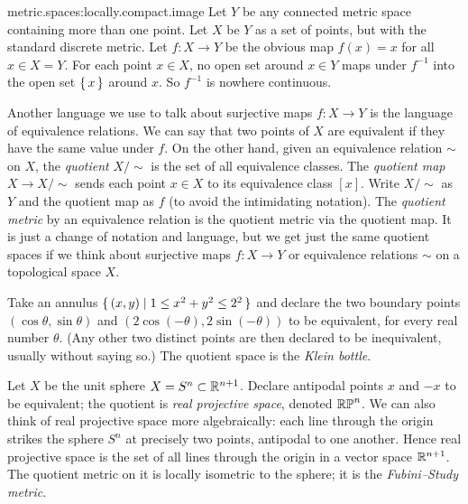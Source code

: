 \begin{answer}{metric.spaces:locally.compact.image}
Let \(Y\) be any connected metric space containing more than one point.
Let \(X\) be \(Y\) as a set of points, but with the standard discrete metric.
Let \(f \colon X \to Y\) be the obvious map \(f(x)=x\) for all \(x \in X=Y\).
For each point \(x \in X\), no open set around \(x \in Y\) maps under \(f^{-1}\) into the open set \(\set{x}\) around \(x\).
So \(f^{-1}\) is nowhere continuous.
\end{answer}
Another language we use to talk about surjective maps \(f \colon X \to Y\) is the language of equivalence relations.
We can say that two points of \(X\) are equivalent if they have the same value under \(f\).
On the other hand, given an equivalence relation \(\sim\) on \(X\), the \emph{quotient} \(X/{\sim}\) is the set of all equivalence classes.
The \emph{quotient map} \(X \to X/{\sim}\) sends each point \(x \in X\) to its equivalence class \([x]\).
Write \(X/{\sim}\) as \(Y\) and the quotient map as \(f\) (to avoid the intimidating notation).
The \emph{quotient metric} by an equivalence relation is the quotient metric via the quotient map.
It is just a change of notation and language, but we get just the same quotient spaces if we think about surjective maps \(f \colon X \to Y\) or equivalence relations \(\sim\) on a topological space \(X\).
\begin{example}
Take an annulus \(\set{(x,y)|1 \le x^2+y^2 \le 2^2}\) and declare the two boundary points \((\cos \theta, \sin \theta)\) and \((2\cos(-\theta),2\sin(-\theta))\) to be equivalent, for every real number \(\theta\).
(Any other two distinct points are then declared to be inequivalent, usually without saying so.)
The quotient space is the \emph{Klein bottle}.
\end{example}
\begin{example}
Let \(X\) be the unit sphere \(X=S^n \subset \mathbb{R}^{n+1}\).
Declare antipodal points \(x\) and \(-x\) to be equivalent; the quotient is \emph{real projective space},%
denoted \(\mathbb{RP}^{n}\).
We can also think of real projective space more algebraically: each line through the origin strikes the sphere \(S^n\) at precisely two points, antipodal to one another.
Hence real projective space is the set of all lines through the origin in a vector space \(\mathbb{R}^{n+1}\).
The quotient metric on it is locally isometric to the sphere; it is the \emph{Fubini--Study metric}.
\end{example}
